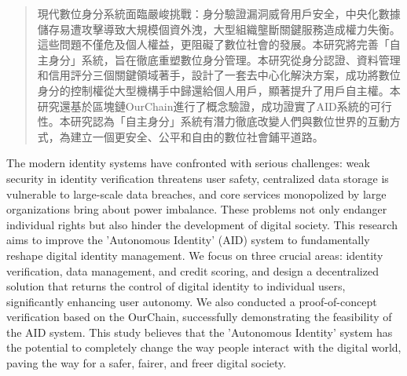 
\begin{abstract}
  現代數位身分系統面臨嚴峻挑戰：身分驗證漏洞威脅用戶安全，中央化數據儲存易遭攻擊導致大規模個資外洩，大型組織壟斷關鍵服務造成權力失衡。這些問題不僅危及個人權益，更阻礙了數位社會的發展。本研究將完善「自主身分」系統，旨在徹底重塑數位身分管理。本研究從身分認證、資料管理和信用評分三個關鍵領域著手，設計了一套去中心化解決方案，成功將數位身分的控制權從大型機構手中歸還給個人用戶，顯著提升了用戶自主權。本研究還基於區塊鏈OurChain進行了概念驗證，成功證實了AID系統的可行性。本研究認為「自主身分」系統有潛力徹底改變人們與數位世界的互動方式，為建立一個更安全、公平和自由的數位社會鋪平道路。
\end{abstract}

\begin{abstract*}
  The modern identity systems have confronted with serious challenges: weak security in identity verification threatens user safety, centralized data storage is vulnerable to large-scale data breaches, and core services monopolized by large organizations bring about power imbalance. These problems not only endanger individual rights but also hinder the development of digital society. This research aims to improve the 'Autonomous Identity' (AID) system to fundamentally reshape digital identity management. We focus on three crucial areas: identity verification, data management, and credit scoring, and design a decentralized solution that returns the control of digital identity to individual users, significantly enhancing user autonomy. We also conducted a proof-of-concept verification based on the OurChain, successfully demonstrating the feasibility of the AID system. This study believes that the 'Autonomous Identity' system has the potential to completely change the way people interact with the digital world, paving the way for a safer, fairer, and freer digital society.
\end{abstract*}